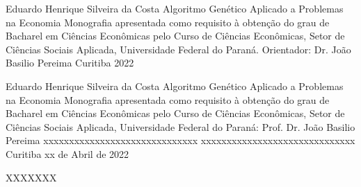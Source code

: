 \folharosto
	{Eduardo Henrique Silveira da Costa}
	{Algoritmo Genético Aplicado a Problemas na Economia}
	{Monografia apresentada como requisito à obtenção do grau de Bacharel em Ciências Econômicas pelo Curso de Ciências Econômicas, Setor de Ciências Sociais Aplicada, Universidade Federal do Paraná.}
	{Orientador: Dr. João Basilio Pereima}
	{Curitiba}
	{2022}


\folhatermoaprovacao
	{Eduardo Henrique Silveira da Costa}
	{Algoritmo Genético Aplicado a Problemas na Economia}
	{Monografia apresentada como requisito à obtenção do grau de Bacharel em Ciências Econômicas pelo Curso de Ciências Econômicas, Setor de Ciências Sociais Aplicada, Universidade Federal do Paraná:}
	{Prof. Dr. João Basilio Pereima}
	{xxxxxxxxxxxxxxxxxxxxxxxxxxxxxx}
	{xxxxxxxxxxxxxxxxxxxxxxxxxxxxxx}
	{Curitiba}
	{xx de Abril de 2022}

\agradecimentos
	{XXXXXXX}

